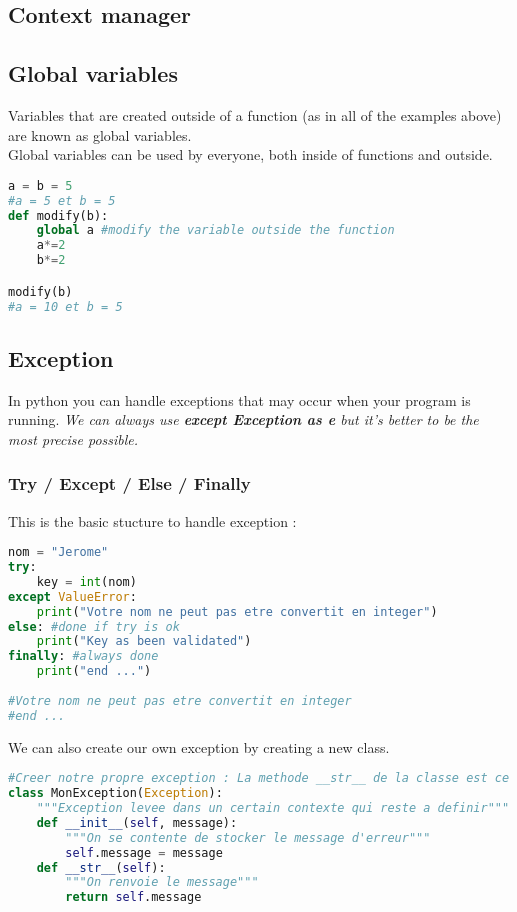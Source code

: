 \documentclass[a4paper, 12pt]{article}
\begin{document}
\subsection{Context manager}
\label{subsec:ContextManager}

\subsection{Global variables}
\label{subsec:Global}
Variables that are created outside of a function (as in all of the examples above) are known as global variables.\\
Global variables can be used by everyone, both inside of functions and outside.
\begin{lstlisting}[language=Python]
a = b = 5
#a = 5 et b = 5
def modify(b):
	global a #modify the variable outside the function
	a*=2
	b*=2

modify(b)
#a = 10 et b = 5
\end{lstlisting}

\subsection{Exception}
In python you can handle exceptions that may occur when your program is running. \textit{We can always use \textbf{except Exception as e} but it's better to be the most precise possible.}
\subsubsection{Try / Except / Else / Finally}
This is the basic stucture to handle exception :
\label{TEEF}
\begin{lstlisting}[language=Python]
nom = "Jerome"
try:
	key = int(nom)
except ValueError:
	print("Votre nom ne peut pas etre convertit en integer")
else: #done if try is ok
	print("Key as been validated")
finally: #always done
	print("end ...")
	
#Votre nom ne peut pas etre convertit en integer
#end ...
\end{lstlisting}

We can also create our own exception by creating a new class.
\begin{lstlisting}[language=Python]
#Creer notre propre exception : La methode __str__ de la classe est ce qui est appele pour afficher le message d'erreur
class MonException(Exception):
    """Exception levee dans un certain contexte qui reste a definir"""
    def __init__(self, message):
        """On se contente de stocker le message d'erreur"""
        self.message = message
    def __str__(self):
        """On renvoie le message"""
        return self.message
\end{lstlisting}
\end{document}
